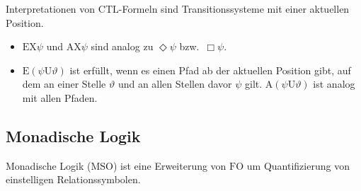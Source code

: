 \documentclass[a4paper,parskip=half*,DIV=15,fontsize=11pt]{scrartcl}
\newcommand{\FO}{\mathrm{FO}}
\newcommand{\MSO}{\mathrm{MSO}}
\newcommand{\CTL}{\mathrm{CTL}}
\newcommand{\X}{\mathrm{X}}
\newcommand{\until}{\mathrm{U}}
\begin{document}
Interpretationen von $\CTL$-Formeln sind Transitionssysteme mit einer aktuellen Position.
\begin{itemize}
\item $\mathrm{E}\X\psi$ und $\mathrm{A}\X\psi$ sind analog zu $\Diamond \psi$ bzw.\ $\Box \psi$.
\item $\mathrm{E}(\psi \until \vartheta)$ ist erfüllt, wenn es einen Pfad ab der aktuellen Position gibt, auf dem an einer Stelle $\vartheta$ und an allen Stellen davor $\psi$ gilt. $\mathrm{A}(\psi \until \vartheta)$ ist analog mit allen Pfaden.
\end{itemize}

\subsection{Monadische Logik}

Monadische Logik ($\MSO$) ist eine Erweiterung von $\FO$ um Quantifizierung von einstelligen Relationssymbolen.
\end{document}
